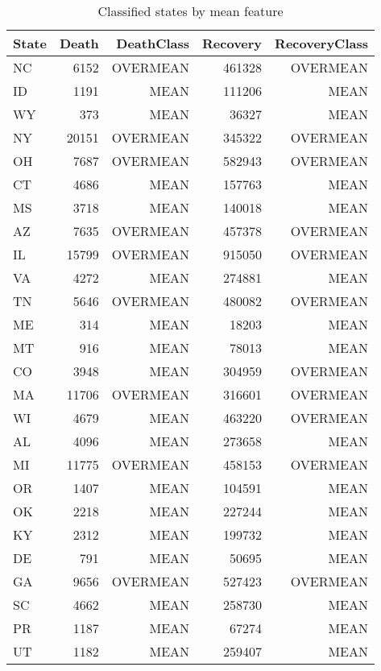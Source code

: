 \begin{table}[h]
        \centering
        \begin{tabular}{l|rrrr}
        \toprule
        State	&		Death		&		DeathClass		&		Recovery	&		RecoveryClass \\\midrule
        NC		&		6152		&		OVERMEAN		&		461328		&		OVERMEAN \\
        ID		&		1191		&		MEAN			&		111206		&		MEAN \\
        WY		&		373			&		MEAN			&		36327		&		MEAN \\
        NY		&		20151		&		OVERMEAN		&		345322		&		OVERMEAN \\
        OH		&		7687		&		OVERMEAN		&		582943		&		OVERMEAN \\
        CT		&		4686		&		MEAN			&		157763		&		MEAN \\
        MS		&		3718		&		MEAN			&		140018		&		MEAN \\
        AZ		&		7635		&		OVERMEAN		&		457378		&		OVERMEAN \\
        IL		&		15799		&		OVERMEAN		&		915050		&		OVERMEAN \\
        VA		&		4272		&		MEAN			&		274881		&		MEAN \\
        TN		&		5646		&		OVERMEAN		&		480082		&		OVERMEAN \\
        ME		&		314			&		MEAN			&		18203		&		MEAN \\
        MT		&		916			&		MEAN			&		78013		&		MEAN \\
        CO		&		3948		&		MEAN			&		304959		&		OVERMEAN \\
        MA		&		11706		&		OVERMEAN		&		316601		&		OVERMEAN \\
        WI		&		4679		&		MEAN			&		463220		&		OVERMEAN \\
        AL		&		4096		&		MEAN			&		273658		&		MEAN \\
        MI		&		11775		&		OVERMEAN		&		458153		&		OVERMEAN \\
        OR		&		1407		&		MEAN			&		104591		&		MEAN \\
        OK		&		2218		&		MEAN			&		227244		&		MEAN \\
        KY		&		2312		&		MEAN			&		199732		&		MEAN \\
        DE		&		791			&		MEAN			&		50695		&		MEAN \\
        GA		&		9656		&		OVERMEAN		&		527423		&		OVERMEAN \\
        SC		&		4662		&		MEAN			&		258730		&		MEAN \\
        PR		&		1187		&		MEAN			&		67274		&		MEAN \\
        UT		&		1182		&		MEAN			&		259407		&		MEAN \\
        \bottomrule
        \end{tabular}
        \caption{Classified states by mean feature}
        \label{tab:classified_states}
\end{table}


